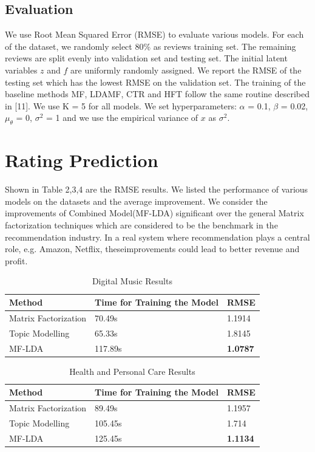 \documentclass[10pt,conference]{IEEEtran}
\begin{document}
\subsection{Evaluation}
We use Root Mean Squared Er​ror (RMSE) to evaluate various models.
For each of the dataset, w​e randomly select 80\% as reviews training set. The remaining review​s are split evenly into validation set and testing set. The initial la​tent variables $z$ and $f$ are uniformly randomly assigned. We repor​t the RMSE of the testing set whi​ch has the lowest RMSE on the valid​ation set. The training of the b​aseline methods MF, LDAMF, CTR and HF​T follow the same routi​ne described in [11]. We use K = 5 for all mo​dels. We set hyperparam​eters: $\alpha$ = 0.1, $\beta$ = 0.​02, $\mu_\theta$ = 0, $\sigma^2$ = 1 and we use the empirical varia​nce of $x$ as $\sigma^2$.

\section{Rating Prediction}

Shown in Table 2,3,4 are the RMSE results. We listed the performance of various models on the datasets and the average improvement.
We consider the improvements of Combined Model(MF-LDA) significant over the general Matrix factorization techniques which are considered to be the benchmark in the recommendation industry. In a real system where r​ecommendation plays a central ro​le, e.g. Amazon, Netflix, these ​improvements could le​ad to bett​er revenue and profit.

\begin{table}[h]
\centering
\caption{Digital Music Results}
\label{Digital Music Results}
\renewcommand{\arraystretch}{1.3}
\begin{tabular}{ lll }
\toprule
\textbf{Method} & \textbf{Time for Training the Model} & \textbf{RMSE} \\
\toprule
Matrix Factorization & 70.49s & 1.1914 \\
\hline
Topic Modelling & 65.33s & 1.8145 \\
\hline
MF-LDA & 117.89s  & \textbf{1.0787} \\ 
\bottomrule
\end{tabular}
\end{table}


\begin{table}[h]
\centering
\caption{Health and Personal Care Results}
\label{Health and Personal Care Results}
\renewcommand{\arraystretch}{1.3}
\begin{tabular}{ lll }
\toprule
\textbf{Method} & \textbf{Time for Training the Model} & \textbf{RMSE} \\
\toprule
Matrix Factorization & 89.49s & 1.1957 \\
\hline
Topic Modelling & 105.45s & 1.714 \\
\hline
MF-LDA & 125.45s  & \textbf{1.1134} \\ 
\bottomrule
\end{tabular}
\end{table}
\end{document}

